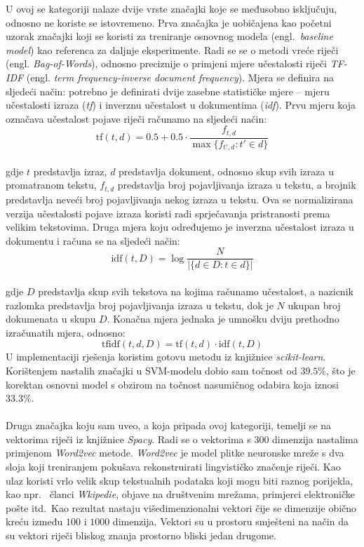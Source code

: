 \documentclass[times, utf8, zavrsni]{fer}
\begin{document}
U ovoj se kategoriji nalaze dvije vrste značajki koje se međusobno isključuju, odnosno ne koriste se istovremeno. Prva značajka je uobičajena kao početni uzorak značajki koji se koristi za treniranje osnovnog modela (engl.~\emph{baseline model}) kao referenca za daljnje eksperimente. Radi se 
se o metodi vreće riječi (engl. \emph{Bag-of-Words}), odnosno preciznije o primjeni mjere učestalosti riječi \emph{TF-IDF} (engl. \emph{term  frequency-inverse  document  frequency}). Mjera se definira na sljedeći način: potrebno je definirati dvije zasebne statističke mjere -- mjeru učestalosti izraza (\emph{tf}) i inverznu učestalost u dokumentima (\emph{idf}). Prvu mjeru koja označava učestalost pojave riječi računamo na sljedeći način: \[ \mathrm{tf}(t,d) = 0.5 + 0.5 \cdot  \frac{f_{t, d}}{\max\{f_{t', d}:t' \in d\}}\]
\noindent\\
gdje $t$ predstavlja izraz, $d$ predstavlja dokument, odnosno skup svih izraza u promatranom tekstu, $f_{t,d}$ predstavlja broj pojavljivanja izraza u tekstu, a brojnik predstavlja neveći broj pojavljivanja nekog izraza u tekstu. Ova se normalizirana verzija učestalosti pojave izraza koristi radi sprječavanja pristranosti prema velikim tekstovima.
Druga mjera koju određujemo je inverzna učestalost izraza u dokumentu i računa se na sljedeći način:
\[ \mathrm{idf}(t, D) =  \log \frac{N}{|\{d \in D: t \in d\}|} \]
\noindent\\
gdje $D$ predstavlja skup svih tekstova na kojima računamo učestalost, a nazicnik razlomka predstavlja broj pojavljivanja izraza u tekstu, dok je $N$ ukupan broj dokumenata u skupu $D$.
Konačna mjera jednaka je umnošku dviju prethodno izračunatih mjera, odnosno: \[ {\displaystyle \mathrm {tfidf} (t,d,D)=\mathrm {tf} (t,d)\cdot \mathrm {idf} (t,D)} \]
\noindent
U implementaciji rješenja koristim gotovu metodu iz knjižnice \emph{scikit-learn}. Korištenjem nastalih značajki u \gls{SVM}-modelu dobio sam točnost od $39.5\%$, što je korektan osnovni model s obzirom na točnost nasumičnog odabira koja iznosi $33.3\%$.\\\\
Druga značajka koju sam uveo, a koja pripada ovoj kategoriji, temelji se na vektorima riječi iz knjižnice \emph{Spacy}. Radi se o vektorima s 300 dimenzija nastalima primjenom \emph{Word2vec} \citep{w2v} metode. \emph{Word2vec} je model plitke neuronske mreže s dva sloja koji treniranjem pokušava rekonstruirati lingvističko značenje riječi. Kao ulaz koristi vrlo velik skup tekstualnih podataka koji mogu biti raznog porijekla, kao npr.~ članci \emph{Wkipedie}, objave na društvenim mrežama, primjerci elektroničke pošte itd.~Kao rezultat nastaju višedimenzionalni vektori čije se dimenzije obično kreću između $100$ i $1000$ dimenzija. Vektori su u prostoru smješteni na način da su vektori riječi bliskog znanja prostorno bliski jedan drugome.\\
\end{document}
